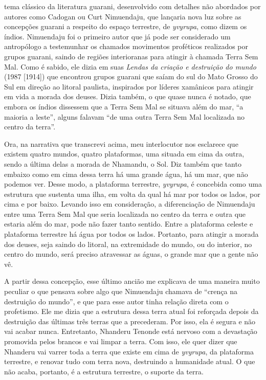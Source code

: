 tema clássico da literatura guarani, desenvolvido com detalhes não
abordados por autores como Cadogan ou Curt Nimuendaju, que lançaria
nova luz sobre as concepções guarani a respeito do espaço terrestre, de
\emph{yvyrupa}, como dizem os índios. Nimuendaju foi o primeiro autor que já
pode ser considerado um antropólogo a testemunhar os chamados
movimentos proféticos realizados por grupos guarani, saindo de regiões
interioranas para atingir à chamada Terra Sem Mal. Como é sabido, ele
dizia em suas \emph{Lendas da criação e destruição do mundo} (1987 [1914]) que
encontrou grupos guarani que saíam do sul do Mato Grosso do Sul em
direção ao litoral paulista, inspirados por líderes xamânicos para
atingir em vida a morada dos deuses. Dizia também, o que quase nunca é
notado, que embora os índios dissessem que a Terra Sem Mal se situava
além do mar, ``a maioria a leste'', alguns falavam ``de uma outra Terra
Sem Mal localizada no centro da terra''.

Ora, na narrativa que transcrevi acima, meu interlocutor nos esclarece
que existem quatro mundos, quatro plataformas, uma situada em cima da
outra, sendo a última delas a morada de Nhamandu, o Sol. Diz também que
tanto embaixo como em cima dessa terra há uma grande água, há um mar,
que não podemos ver. Desse modo, a plataforma terrestre, \emph{yvyrupa}, é
concebida como uma estrutura que sustenta uma ilha, em volta da qual há
mar por todos os lados, por cima e por baixo. Levando isso em
consideração, a diferenciação de Nimuendaju entre uma Terra Sem Mal que
seria localizada no centro da terra e outra que estaria além do mar,
pode não fazer tanto sentido. Entre a plataforma celeste e plataforma
terrestre há água por todos os lados. Portanto, para atingir a morada
dos deuses, seja saindo do litoral, na extremidade do mundo, ou do
interior, no centro do mundo, será preciso atravessar as águas, o
grande mar que a gente não vê.

A partir dessa concepção, esse último ancião me explicava de uma maneira
muito peculiar o que pensava sobre algo que Nimuendaju chamava de
``crença na destruição do mundo'', e que para esse autor tinha relação
direta com o profetismo. Ele me dizia que a estrutura dessa terra atual
foi reforçada depois da destruição das últimas três terras que a
precederam. Por isso, ela é segura e não vai acabar nunca. Entretanto,
Nhanderu Tenonde está nervoso com a devastação promovida pelos brancos
e vai limpar a terra. Com isso, ele quer dizer que Nhanderu vai varrer
toda a terra que existe em cima de \emph{yvyrupa}, da plataforma terrestre, e
renovar tudo com terra nova, destruindo a humanidade atual. O que não
acaba, portanto, é a estrutura terrestre, o suporte da terra. 

